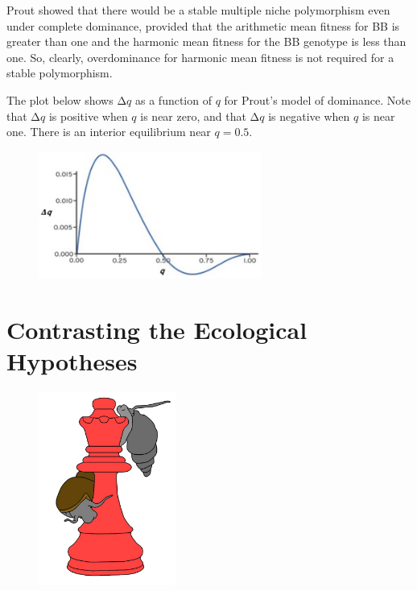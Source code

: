 \documentclass[
  letterpaper,
]{book}
\begin{document}
\begin{tcolorbox}
Prout showed that there would be a stable multiple niche polymorphism
even under complete dominance, provided that the arithmetic mean fitness
for BB is greater than one and the harmonic mean fitness for the BB
genotype is less than one. So, clearly, overdominance for harmonic mean
fitness is not required for a stable polymorphism.\footnotemark{}

The plot below shows \(\mathrm{\Delta}q\) as a function of \(q\) for
Prout's model of dominance. Note that \(\mathrm{\Delta}q\) is positive
when \(q\) is near zero, and that \(\mathrm{\Delta}q\) is negative when
\(q\) is near one. There is an interior equilibrium near \(q = 0.5\).

\begin{figure}[H]

{\centering \includegraphics[width=0.65\textwidth,height=\textheight]{images/fig2-5.jpg}

}

\end{figure}

\end{tcolorbox}


\hypertarget{contrasting-the-ecological-hypotheses}{%
\chapter{Contrasting the Ecological
Hypotheses}\label{contrasting-the-ecological-hypotheses}}

\begin{figure}

{\centering \includegraphics[width=0.4\textwidth,height=\textheight]{images/fig3-1.jpeg}

}

\end{figure}
\end{document}
